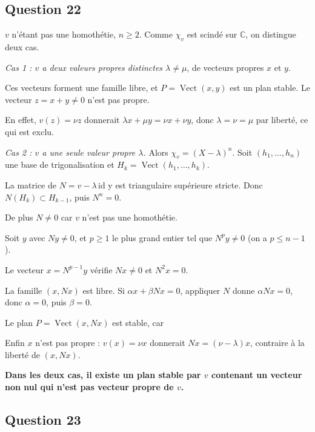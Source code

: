 \documentclass[11pt,a4paper]{article}
\newcommand{\equationajustee}[1]{%
  \sbox{\boiteequation}{$\displaystyle #1$}%
  \ifdim\wd\boiteequation>\linewidth
    \[\resizebox{\linewidth}{!}{\usebox{\boiteequation}}\]%
  \else
    \[#1\]%
  \fi}
\begin{document}
\hypertarget{question-22}{%
\subsection{Question 22}\label{question-22}}

\(v\) n'étant pas une homothétie, \(n\ge2\). Comme \(\chi_v\) est scindé sur \(\mathbb C\), on distingue deux cas.

\emph{Cas 1 : \(v\) a deux valeurs propres distinctes \(\lambda\neq\mu\)}, de vecteurs propres \(x\) et \(y\).

Ces vecteurs forment une famille libre, et \(P=\operatorname{Vect}(x,y)\) est un plan stable. Le vecteur \(z=x+y\neq0\) n'est pas propre.

En effet, \(v(z)=\nu z\) donnerait \(\lambda x+\mu y=\nu x+\nu y\), donc \(\lambda=\nu=\mu\) par liberté, ce qui est exclu.

\emph{Cas 2 : \(v\) a une seule valeur propre \(\lambda\).} Alors \(\chi_v=(X-\lambda)^n\). Soit \((h_1,\dots,h_n)\) une base de trigonalisation et \(H_k=\operatorname{Vect}(h_1,\dots,h_k)\).

La matrice de \(N=v-\lambda\,\mathrm{id}\) y est triangulaire supérieure stricte. Donc \(N(H_k)\subset H_{k-1}\), puis \(N^n=0\).

De plus \(N\neq0\) car \(v\) n'est pas une homothétie.

Soit \(y\) avec \(Ny\neq0\), et \(p\ge1\) le plus grand entier tel que \(N^py\neq0\) (on a \(p\le n-1\)).

Le vecteur \(x=N^{p-1}y\) vérifie \(Nx\neq0\) et \(N^2x=0\).

La famille \((x,Nx)\) est libre. Si \(\alpha x+\beta Nx=0\), appliquer \(N\) donne \(\alpha Nx=0\), donc \(\alpha=0\), puis \(\beta=0\).

Le plan \(P=\operatorname{Vect}(x,Nx)\) est stable, car
\equationajustee{\begin{aligned}v(x)&=\lambda x+Nx,\\ v(Nx)&=\lambda Nx.\end{aligned}}

Enfin \(x\) n'est pas propre : \(v(x)=\nu x\) donnerait \(Nx=(\nu-\lambda)x\), contraire à la liberté de \((x,Nx)\).

\textbf{Dans les deux cas, il existe un plan stable par \(v\) contenant un vecteur non nul qui n'est pas vecteur propre de \(v\).}

\hypertarget{question-23}{%
\subsection{Question 23}\label{question-23}}
\end{document}
